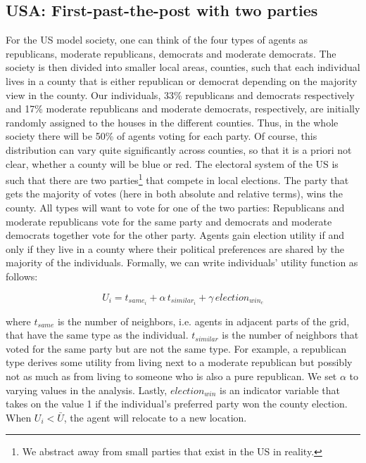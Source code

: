 \documentclass[12pt, a4paper]{article}
\begin{document}
	\subsection{USA: First-past-the-post with two parties}
	For the US model society, one can think of the four types of agents as republicans, moderate republicans, democrats and moderate democrats. The society is then divided into smaller local areas, counties, such that each individual lives in a county that is either republican or democrat depending on the majority view in the county. Our individuals, 33\% republicans and democrats respectively and 17\% moderate republicans and moderate democrats, respectively, are initially randomly assigned to the houses in the different counties.
	Thus, in the whole society there will be 50\% of agents voting for each party. Of course, this distribution can vary quite significantly across counties, so that it is a priori not clear, whether a county will be blue or red.
	The electoral system of the US is such that there are two parties\footnote{We abstract away from small parties that exist in the US in reality.} that compete in local elections. The party that gets the majority of votes (here in both absolute and relative terms), wins the county. All types will want to vote for one of the two parties: Republicans and moderate republicans vote for the same party and democrats and moderate democrats together vote for the other party. Agents gain election utility if and only if they live in a county where their political preferences are shared by the majority of the individuals. Formally, we can write individuals' utility function as follows:
	
	
	\begin{equation}
	U_i=t_{same_i}+\alpha \, t_{similar_i}+\gamma \, election_{win_c}
	\end{equation}
	
	where $t_{same}$ is the number of neighbors, i.e. agents in adjacent parts of the grid, that have the same type as the individual. $t_{similar}$ is the number of neighbors that voted for the same party but are not the same type. For example, a republican type derives some utility from living next to a moderate republican but possibly not as much as from living to someone who is also a pure republican. We set $\alpha$ to varying values in the analysis. Lastly, $election_{win}$ is an indicator variable that takes on the value 1 if the individual's preferred party won the county election. When $U_i < \bar{U}$, the agent will relocate to a new location.
	
\end{document}
